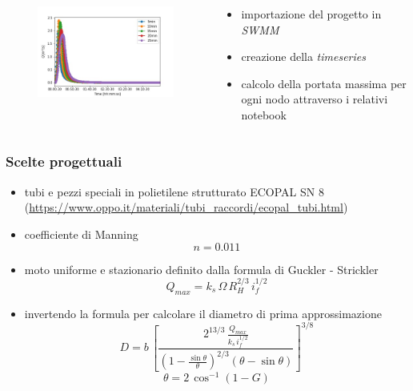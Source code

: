 \documentclass{beamer}
\begin{document}
\begin{frame}
\begin{columns}
\begin{column}{.5\textwidth}
\begin{figure}
\begin{overprint}
     \includegraphics[width=\linewidth]{images/portata_massima}
   \end{overprint}
  \end{figure}   
  \end{column}
  
  \begin{column}{.5\textwidth}
   \begin{itemize}
    \item importazione del progetto in \emph{SWMM}
    \item creazione della \emph{timeseries}
    \item calcolo della portata massima per ogni nodo attraverso i relativi notebook
  \end{itemize}
  \end{column}
 \end{columns}
\end{frame}

\begin{frame}
 \frametitle{Scelte progettuali}
 \begin{itemize}
  \item tubi e pezzi speciali in polietilene strutturato ECOPAL SN 8 (\url{https://www.oppo.it/materiali/tubi_raccordi/ecopal_tubi.html})
  \item coefficiente di Manning \[n = 0.011\]
  \item moto uniforme e stazionario definito dalla formula di Guckler - Strickler
  \[Q_{max} = k_s\,\Omega\,R_H^{2/3}\,i_f^{1/2}\]
  \item invertendo la formula per calcolare il diametro di prima approssimazione
  \[
   D = b\,\left[ \frac{2^{13/3}\,\frac{Q_{max}}{k_s\,i_f^{1/2}}}{(1-\frac{\sin \theta}{\theta})^{2/3}(\theta -\sin \theta)}\right]^{3/8}
  \]
  \[
   \theta = 2\, \cos^{-1} (1-G)
  \]
 \end{itemize}
\end{frame}
\end{document}
